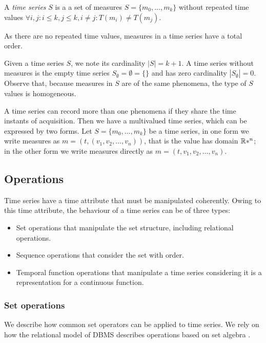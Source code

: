 \begin{definition}
  A \emph{time series} $S$ is a a set of measures $S = \{m_0, \ldots,
  m_k\}$ without repeated time values $\forall i,j: i\leq k, j\leq k,
  i\neq j : T(m_i)\neq T(m_j)$.
\end{definition}

As there are no repeated time values, measures in a time series have a
total order.

Given a time series $S$, we note its cardinality $|S|=k+1$.  A time
series without measures is the empty time series
$S_\emptyset=\emptyset=\{\}$ and has zero cardinality
$|S_\emptyset|=0$.  Observe that, because measures in $S$ are of the
same phenomena, the type of $S$ values is homogeneous.



A time series can record more than one phenomena if they share the
time instants of acquisition. Then we have a multivalued time series,
which can be expressed by two forms. Let $S = \{m_0, \ldots, m_k\}$ be
a time series, in one form we write measures as
$m=(t,(v_1,v_2,\ldots,v_n))$, that is the value has domain $\mathbb{R}*^n$; in
the other form we write measures directly as
$m=(t,v_1,v_2,\ldots,v_n)$.




\subsection{Operations}

Time series have a time attribute that must be manipulated
coherently. Owing to this time attribute, the behaviour of a time
series can be of three types:
\begin{itemize}
\item Set operations that manipulate the set structure, including
  relational operations.
\item Sequence operations that consider the set with order.
\item Temporal function operations that manipulate a time series
  considering it is a representation for a continuous function.
\end{itemize}




\subsubsection{Set operations}

We describe how common set operators can be applied to time series. We
rely on how the relational model of DBMS describes operations based on
set algebra \cite{date:introduction}.


